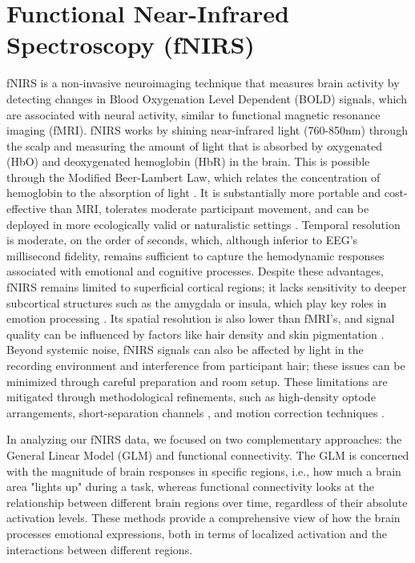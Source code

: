 \section{Functional Near-Infrared Spectroscopy (fNIRS)}
fNIRS is a non-invasive neuroimaging technique that measures brain activity by detecting changes in Blood Oxygenation Level Dependent (BOLD) signals, which are associated with neural activity, similar to functional magnetic resonance imaging (fMRI).
fNIRS works by shining near-infrared light (760-850nm) through the scalp and measuring the amount of light that is absorbed by oxygenated (HbO) and deoxygenated hemoglobin (HbR) in the brain.
This is possible through the Modified Beer-Lambert Law, which relates the concentration of hemoglobin to the absorption of light \citep{kocsis_modified_2006}.
It is substantially more portable and cost-effective than MRI, tolerates moderate participant movement, and can be deployed in more ecologically valid or naturalistic settings \citep{yucel_functional_2017}. 
Temporal resolution is moderate, on the order of seconds, which, although inferior to EEG's millisecond fidelity, remains sufficient to capture the hemodynamic responses associated with emotional and cognitive processes. 
Despite these advantages, fNIRS remains limited to superficial cortical regions; it lacks sensitivity to deeper subcortical structures such as the amygdala or insula, which play key roles in emotion processing \citep{sato_amygdala_2004}. 
Its spatial resolution is also lower than fMRI's, and signal quality can be influenced by factors like hair density and skin pigmentation \citep{holmes_opening_2024}. 
Beyond systemic noise, fNIRS signals can also be affected by light in the recording environment and interference from participant hair; these issues can be minimized through careful preparation and room setup.
These limitations are mitigated through methodological refinements, such as high-density optode arrangements, short-separation channels \citep{scholkmann_measuring_2014}, and motion correction techniques \citep{fishburn_temporal_2019, bergmann_evaluation_2023}. 

In analyzing our fNIRS data, we focused on two complementary approaches: the General Linear Model (GLM) and functional connectivity.
The GLM is concerned with the magnitude of brain responses in specific regions, i.e., how much a brain area "lights up" during a task, whereas functional connectivity looks at the relationship between different brain regions over time, regardless of their absolute activation levels.
These methods provide a comprehensive view of how the brain processes emotional expressions, both in terms of localized activation and the interactions between different regions.

